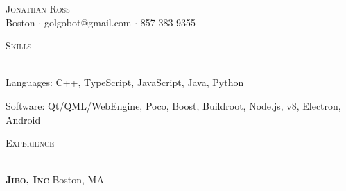 \documentclass[a4paper]{article}
\newcommand{\lineunder} {
    \vspace*{-8pt} \\
    \hspace*{-18pt} \hrulefill \\
}
\newcommand{\header} [1] {
    {\hspace*{-18pt}\vspace*{6pt} \textsc{#1}}
    \vspace*{-6pt} \lineunder
    \vspace{2mm}
}
\begin{document}
\vspace*{-40pt}

    

\vspace*{-10pt}
\begin{center}
	{\Huge \scshape {Jonathan Ross}}\\
	Boston $\cdot$ golgobot@gmail.com $\cdot$ 857-383-9355\\
\end{center}

\header{Skills}

Languages: C++, TypeScript, JavaScript, Java, Python

\vspace{2mm}

Software: Qt/QML/WebEngine, Poco, Boost, Buildroot, Node.js, v8, Electron, 
    Android




\vspace{4mm}

\header{Experience}
\vspace{1mm}

\textbf{\textsc{Jibo, Inc}} \hfill Boston, MA\\
\vspace{2mm}
\end{document}
